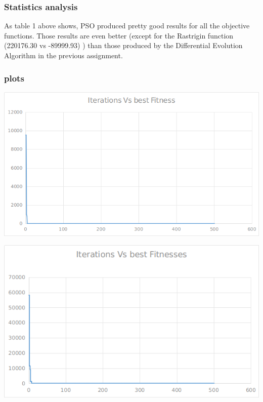 \documentclass[12pt]{article}
\begin{document}
			\subsubsection{Statistics analysis}
			
				As table 1 above shows, PSO produced pretty good results for all the objective functions. Those results are even better (except for the Rastrigin function (220176.30 vs -89999.93) ) than those produced by the Differential Evolution Algorithm in the previous assignment.
			\subsubsection{plots}
				\begin{minipage}{0.6\linewidth}
					\includegraphics[width=\linewidth]{1.png}
				\end{minipage}
				\hfill
				\begin{minipage}{0.6\linewidth}
					\includegraphics[width=\linewidth]{2.png}
				\end{minipage}
\end{document}

